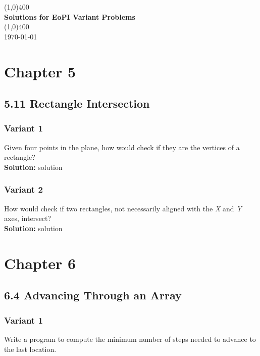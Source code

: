 \documentclass{article}
\begin{document}
\begin{titlepage}
	\begin{center}
    \line(1,0){400}\\
    [0.65cm]
	\huge{\bfseries Solutions for EoPI Variant Problems}\\
	\line(1,0){400}\\	
	\textsc{\LARGE \today}\\
	[5.5cm]     
	\end{center}
\end{titlepage}

\section*{Chapter 5}
\subsection*{5.11 Rectangle Intersection}
\subsubsection*{Variant 1}
Given four points in the plane, how would check if they are the vertices of a rectangle?\\

\noindent\textbf{Solution:} solution

\subsubsection*{Variant 2}
How would check if two rectangles, not necessarily aligned with the \textit{X} and \textit{Y} axes, intersect?\\

\noindent\textbf{Solution:} solution

\section*{Chapter 6}
\subsection*{6.4 Advancing Through an Array}
\subsubsection*{Variant 1}
Write a program to compute the minimum number of steps needed to advance to the last location.\\
\end{document}
